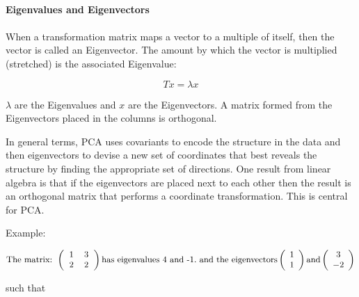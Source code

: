 \documentclass[11pt, oneside]{article}   	%
\begin{document}
\paragraph{Eigenvalues and Eigenvectors}
\paragraph{}

When a transformation matrix maps a vector to a multiple of itself, then the vector is called an Eigenvector. The amount by which the vector is multiplied (stretched) is the associated Eigenvalue:

\begin{equation}
T x = \lambda x
\end{equation} 

$\lambda$ are the Eigenvalues and $x$ are the Eigenvectors. A matrix formed from the Eigenvectors placed in the columns is orthogonal.

In general terms, PCA uses covariants to encode the structure in the data and then eigenvectors to devise a new set of coordinates that best reveals the structure by finding the appropriate set of directions. One result from linear algebra is that if the eigenvectors are placed next to each other then the result is an orthogonal matrix that performs a coordinate transformation. This is central for PCA.

Example: 

\[ \text{The matrix: }
%
   \left(
      \begin{tabular}{cc}
      1 & 3 \\ 
      2 & 2
      \end{tabular}
   \right)
   \text{has eigenvalues 4 and -1.}
   \text{ and the eigenvectors}
   \left( \begin{array}{c}
      1 \\ 
      1
      \end{array}
   \right)
   \text{and} 
   \left( \begin{array}{c}
      3 \\ 
      -2
      \end{array}
   \right)
\]


such that
\end{document}
